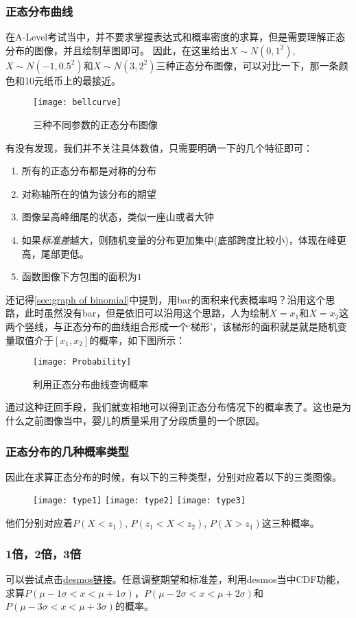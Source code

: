 \subsubsection*{正态分布曲线}
在A-Level考试当中，并不要求掌握表达式和概率密度的求算，但是需要理解正态分布的图像，并且绘制草图即可。
因此，在这里给出$X\sim N(0,1^2)$,$X\sim N(-1,0.5^2)$和$X\sim N(3,2^2)$三种正态分布图像，可以对比一下，那一条颜色和10元纸币上的最接近。
\begin{figure}[H]
\centering
\texttt{[image: bellcurve]}
\caption{三种不同参数的正态分布图像}
\end{figure}
有没有发现，我们并不关注具体数值，只需要明确一下的几个特征即可：
\begin{enumerate}
	\item 所有的正态分布都是对称的分布
	\item 对称轴所在的值为该分布的期望
	\item 图像呈高峰细尾的状态，类似一座山或者大钟
	\item 如果\emph{标准差}越大，则随机变量的分布更加集中(底部跨度比较小)，体现在峰更高，尾部更低。
	\item 函数图像下方包围的面积为$1$
\end{enumerate}
还记得\ref{sec:graph of binomial}中提到，用bar的面积来代表概率吗？沿用这个思路，此时虽然没有bar，但是依旧可以沿用这个思路，人为绘制$X=x_1$和$X=x_2$这两个竖线，与正态分布的曲线组合形成一个`梯形'，该梯形的面积就是就是随机变量取值介于$[x_1,x_2]$的概率，如下图所示：
\begin{figure}[H]
\centering
\texttt{[image: Probability]}
\caption{利用正态分布曲线查询概率}
\end{figure}
通过这种迂回手段，我们就变相地可以得到正态分布情况下的概率表了。这也是为什么之前图像当中，婴儿的质量采用了分段质量的一个原因。

\subsubsection*{正态分布的几种概率类型}
因此在求算正态分布的时候，有以下的三种类型，分别对应着以下的三类图像。
\begin{figure}[H]
\centering
\texttt{[image: type1]}
\texttt{[image: type2]}
\texttt{[image: type3]}
\end{figure}
他们分别对应着$P(X<z_1)$, $P(z_1<X<z_2)$, $P(X>z_1)$这三种概率。

\subsubsection*{1倍，2倍，3倍}
\label{subsub:3sd}
可以尝试点击\href{https://www.desmos.com/calculator/q8piat9t0t}{desmos链接}。任意调整期望和标准差，利用desmos当中CDF功能，求算$P(\mu-1\sigma<x<\mu+1\sigma)$，$P(\mu-2\sigma<x<\mu+2\sigma)$和$P(\mu-3\sigma<x<\mu+3\sigma)$的概率。

